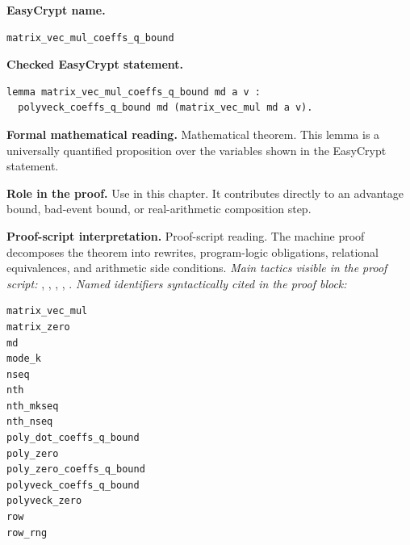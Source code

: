 \begin{formaltheorem}
\noindent\textbf{EasyCrypt name.}
\begin{lstlisting}[language=EasyCrypt,basicstyle=\ttfamily\scriptsize]
matrix_vec_mul_coeffs_q_bound
\end{lstlisting}
\noindent\textbf{Checked EasyCrypt statement.}
\begin{lstlisting}[language=EasyCrypt,basicstyle=\ttfamily\scriptsize]
lemma matrix_vec_mul_coeffs_q_bound md a v :
  polyveck_coeffs_q_bound md (matrix_vec_mul md a v).
\end{lstlisting}
\noindent\textbf{Formal mathematical reading.}
Mathematical theorem. This lemma is a universally quantified proposition over the variables shown in the EasyCrypt statement.

\noindent\textbf{Role in the proof.}
Use in this chapter. It contributes directly to an advantage bound, bad-event bound, or real-arithmetic composition step.

\noindent\textbf{Proof-script interpretation.}
Proof-script reading. The machine proof decomposes the theorem into rewrites, program-logic obligations, relational equivalences, and arithmetic side conditions.
\emph{Main tactics visible in the proof script:} , , , , .
\emph{Named identifiers syntactically cited in the proof block:}
\begin{lstlisting}[language=EasyCrypt,basicstyle=\ttfamily\scriptsize]
matrix_vec_mul
matrix_zero
md
mode_k
nseq
nth
nth_mkseq
nth_nseq
poly_dot_coeffs_q_bound
poly_zero
poly_zero_coeffs_q_bound
polyveck_coeffs_q_bound
polyveck_zero
row
row_rng
\end{lstlisting}

\end{formaltheorem}

